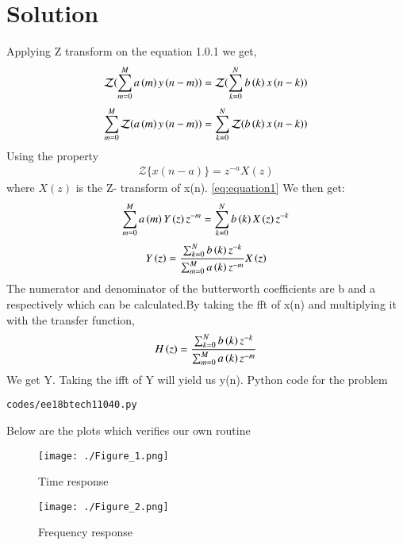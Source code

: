 \documentclass[journal,12pt,twocolumn]{IEEEtran}
\begin{document}
  \section{Solution}
 Applying Z transform on the equation 1.0.1 we get,
     \begin{align}
        \mathcal {Z}( \sum _{m=0}^{M}a\left(m\right)y\left(n-m\right) )= \mathcal {Z}( \sum _{k=0}^{N}b\left(k\right)x\left(n-k\right) )
    \end{align}
     \begin{align}
        \sum _{m=0}^{M} \mathcal {Z} (a\left(m\right)y\left(n-m\right))= \sum _{k=0}^{N}\mathcal {Z} (b\left(k\right)x\left(n-k\right) )
    \end{align}
Using the property
  \begin{align}
      {\mathcal {Z}}\{x(n-a)\} = z^{-a}X(z) 
  \end{align}
  where $X(z)$ is the Z- transform of x(n).\bigskip
  \eqref{eq:equation1}  We then get:
\begin{align}
     \sum _{m=0}^{M}a\left(m\right) Y\left(z\right) z^{-m} =  \sum _{k=0}^{N}b\left(k\right)X\left(z\right)z^{-k}
\end{align}
\begin{align}
    Y\left(z\right) = \frac{\sum _{k=0}^{N}b\left(k\right)z^{-k}}{\sum _{m=0}^{M}a\left(k\right)z^{-m}}{X\left(z\right)}
\end{align}
The numerator and denominator of the butterworth coefficients are b and a respectively which can be calculated.By taking the fft of x(n) and multiplying it with the transfer function,
\begin{align}
    H\left(z\right) = \frac{\sum _{k=0}^{N}b\left(k\right)z^{-k}}{\sum _{m=0}^{M}a\left(k\right)z^{-m}}
\end{align}
We get Y. Taking the ifft of Y will yield us y(n).
\bigskip
Python code for the problem
\begin{lstlisting}
codes/ee18btech11040.py
\end{lstlisting}
 
 Below are the plots which verifies our own routine
 \begin{figure}[!ht]
    \centering
    \texttt{[image: ./Figure\_1.png]}
    \caption{Time response}
    \label{fig:ee18btech11042_1}
\end{figure}
 \begin{figure}[!ht]
    \centering
    \texttt{[image: ./Figure\_2.png]}
    \caption{Frequency response}
    \label{fig:ee18btech11042_2}
\end{figure}
\end{document}
